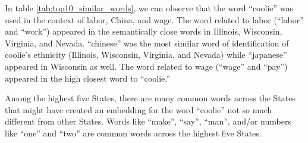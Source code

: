 \documentclass[11pt]{article}
\begin{document}
In table \ref{tab:top10_similar_words}, we can observe that the word ``coolie'' was used in the context of labor, China, and wage.
The word related to labor (``labor'' and ``work'') appeared in the semantically close words in Illinois, Wisconsin, Virginia, and Nevada.
``chinese'' was the most similar word of identification of coolie's ethnicity (Illinois, Wisconsin, Virginia, and Nevada) while
``japanese'' appeared in Wisconsin as well. 
The word related to wage (``wage'' and ``pay'') appeared in the high closest word to ``coolie.''

Among the highest five States, there are many common words across the States that might have created an embedding for the word ``coolie''
not so much different from other States. Words like ``make'', ``say'', ``man'', and/or numbers like ``one'' and ``two'' are common words
across the highest five States.
\end{document}
